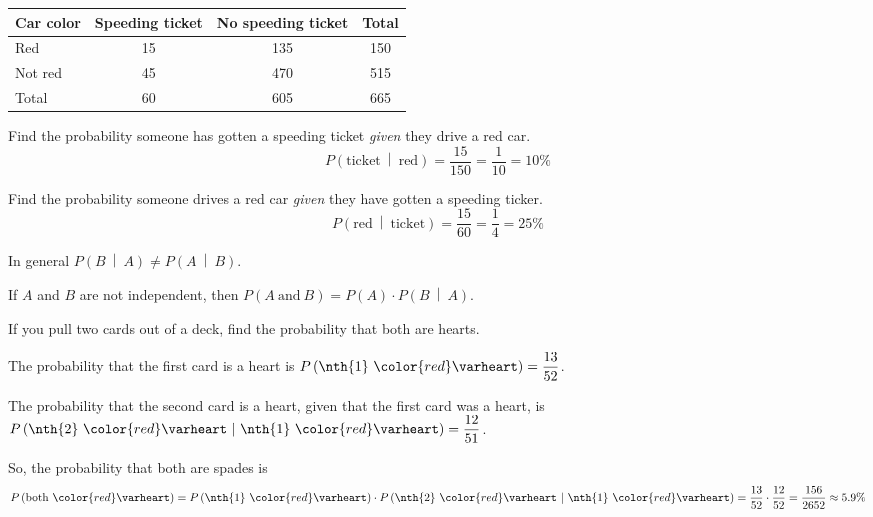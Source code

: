 \documentclass{beamer}
\newcommand{\suitheart}[1][]{{\color{red}\text{#1}\varheart}}
\newcommand{\prob}[1]{P\left(#1\right)}
\newcommand{\condprob}[2]{\prob{#1~\middle|~#2}}
\begin{document}
\begin{frame}
\begin{example}
\begin{center}
\begin{tabular}{|l|c|c|c|}
\hline
Car color & Speeding ticket & No speeding ticket & Total \\ \hline
Red & 15 & 135 & 150 \\ \hline
Not red & 45 & 470 & 515 \\ \hline
Total & 60 & 605 & 665 \\ \hline
\end{tabular}
\end{center}

Find the probability someone has gotten a speeding ticket \emph{given} they drive a red car.\pause
\begin{equation*}
\condprob{\text{ticket}}{\text{red}} = \dfrac{15}{150} = \dfrac{1}{10} = 10\%
\end{equation*}\pause

Find the probability someone drives a red car \emph{given} they have gotten a speeding ticker.\pause
\begin{equation*}
\condprob{\text{red}}{\text{ticket}} = \dfrac{15}{60} = \dfrac{1}{4} = 25\%
\end{equation*}
\end{example}\pause

\begin{note}
In general $\condprob{B}{A}\neq\condprob{A}{B}$.
\end{note}
\end{frame}

\begin{frame}
\begin{definition}
If $A$ and $B$ are not independent, then $\prob{A~\text{and}~B}=\prob{A}\cdot\condprob{B}{A}$.
\end{definition}\pause

\begin{example}
If you pull two cards out of a deck, find the probability that both are hearts.\pause

\vspace{2mm}
The probability that the first card is a heart is $\prob{\text{\nth{1} $\suitheart$}}=\dfrac{13}{52}$.\pause

\vspace{2mm}
The probability that the second card is a heart, given that the first card was a heart, is $\condprob{\text{\nth{2} $\suitheart$}}{\text{\nth{1} $\suitheart$}}=\dfrac{12}{51}$.\pause

\vspace{2mm}
So, the probability that both are spades is
\begin{equation*}
\prob{\text{both $\suitheart$}}=\prob{\text{\nth{1} $\suitheart$}}\cdot\condprob{\text{\nth{2} $\suitheart$}}{\text{\nth{1} $\suitheart$}} =  \dfrac{13}{52} \cdot \dfrac{12}{52} = \dfrac{156}{2652} \approx 5.9\%
\end{equation*}
\end{example}
\end{frame}
\end{document}
